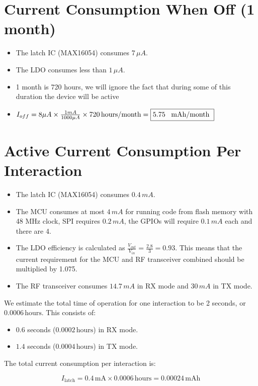 \documentclass{article}
\begin{document}
\section{Current Consumption When Off (1 month)}
\begin{itemize}
    \item The latch IC (MAX16054) consumes \(7 \, \mu A\).
    \item The LDO consumes less than \(1 \, \mu A\).
    \item 1 month is 720 hours, we will ignore the fact that during some of this duration the device will be active
    \item \(I_{off} = 8 \mu A \times \frac{1 mA}{1000 \mu A} \times 720 \, \text{hours/month} = \fbox{5.75 \, \text{mAh/month} } \)
\end{itemize}

\section{Active Current Consumption Per Interaction}
\begin{itemize}
    \item The latch IC (MAX16054) consumes \(0.4 \, mA\).
    \item The MCU consumes at most \(4 \, mA\) for running code from flash memory with 48 MHz clock, SPI requires \(0.2 \, mA\), the GPIOs will require \(0.1 \, mA\) each and there are 4.
    \item The LDO efficiency is calculated as \(\frac{V_{out}}{V_{in}} = \frac{2.8}{3} = 0.93\). This means that the current requirement for the MCU and RF transceiver combined should be multiplied by 1.075. 
    \item The RF transceiver consumes \(14.7 \, mA\) in RX mode and \(30 \, mA\) in TX mode.
\end{itemize}

We estimate the total time of operation for one interaction to be 2 seconds, or \(0.0006 \, \text{hours}\). This consists of:
\begin{itemize}
    \item \(0.6\) seconds (\(0.0002 \, \text{hours}\)) in RX mode.
    \item \(1.4\) seconds (\(0.0004 \, \text{hours}\)) in TX mode.
\end{itemize}

The total current consumption per interaction is:

\[
I_{\text{latch}} = 0.4 \, \text{mA} \times  0.0006 \, \text{hours} = 0.00024 \, \text{mAh}
\]
\end{document}
